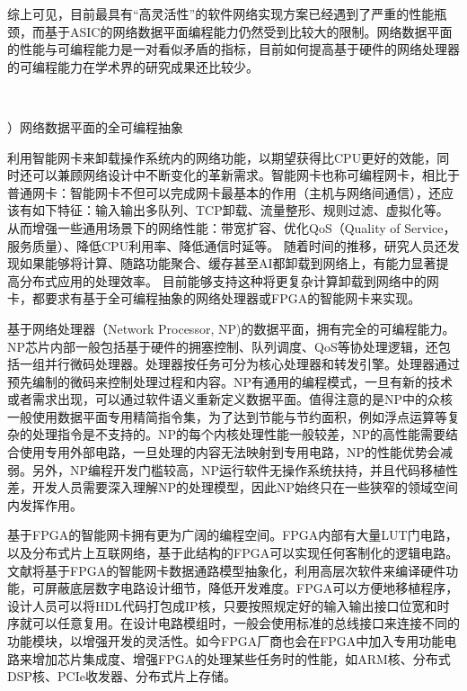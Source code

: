 综上可见，目前最具有“高灵活性”的软件网络实现方案已经遇到了严重的性能瓶颈，而基于ASIC的网络数据平面编程能力仍然受到比较大的限制。网络数据平面的性能与可编程能力是一对看似矛盾的指标，目前如何提高基于硬件的网络处理器的可编程能力在学术界的研究成果还比较少。
 
  
   \ \ 

\label{chap123}


{）网络数据平面的全可编程抽象}


利用智能网卡来卸载操作系统内的网络功能，以期望获得比CPU更好的效能，同时还可以兼顾网络设计中不断变化的革新需求。智能网卡也称可编程网卡，相比于普通网卡：智能网卡不但可以完成网卡最基本的作用（主机与网络间通信），还应该有如下特征：输入输出多队列、TCP卸载、流量整形、规则过滤、虚拟化等。从而增强一些通用场景下的网络性能：带宽扩容、优化QoS（Quality of Service，服务质量）、降低CPU利用率、降低通信时延等。
随着时间的推移，研究人员还发现如果能够将计算、随路功能聚合、缓存甚至AI都卸载到网络上，有能力显著提高分布式应用的处理效率。
目前能够支持这种将更复杂计算卸载到网络中的网卡，都要求有基于全可编程抽象的网络处理器或FPGA的智能网卡来实现。

基于网络处理器（Network Processor, NP)的数据平面，拥有完全的可编程能力。NP芯片内部一般包括基于硬件的拥塞控制、队列调度、QoS等协处理逻辑，还包括一组并行微码处理器。处理器按任务可分为核心处理器和转发引擎。处理器通过预先编制的微码来控制处理过程和内容。NP有通用的编程模式，一旦有新的技术或者需求出现，可以通过软件语义重新定义数据平面。值得注意的是NP中的众核一般使用数据平面专用精简指令集，为了达到节能与节约面积，例如浮点运算等复杂的处理指令是不支持的。NP的每个内核处理性能一般较差，NP的高性能需要结合使用专用外部电路，一旦处理的内容无法映射到专用电路，NP的性能优势会减弱。另外，NP编程开发门槛较高，NP运行软件无操作系统扶持，并且代码移植性差，开发人员需要深入理解NP的处理模型，因此NP始终只在一些狭窄的领域空间内发挥作用。



基于FPGA的智能网卡拥有更为广阔的编程空间。FPGA内部有大量LUT门电路，以及分布式片上互联网络，基于此结构的FPGA可以实现任何客制化的逻辑电路。文献\cite{wang2017p4fpga}将基于FPGA的智能网卡数据通路模型抽象化，利用高层次软件来编译硬件功能，可屏蔽底层数字电路设计细节，降低开发难度。FPGA可以方便地移植程序，设计人员可以将HDL代码打包成IP核，只要按照规定好的输入输出接口位宽和时序就可以任意复用。在设计电路模组时，一般会使用标准的总线接口来连接不同的功能模块，以增强开发的灵活性。如今FPGA厂商也会在FPGA中加入专用功能电路来增加芯片集成度、增强FPGA的处理某些任务时的性能，如ARM核、分布式DSP核、PCIe收发器、分布式片上存储。

